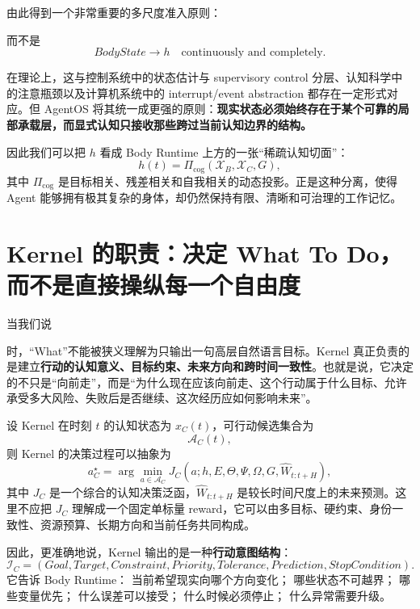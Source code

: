 由此得到一个非常重要的多尺度准入原则：
\begin{statementbox}
\centering
{}
\end{statementbox}
而不是
\[
BodyState
\rightarrow h
\quad
\text{continuously and completely}.
\]

在理论上，这与控制系统中的状态估计与 supervisory control 分层、认知科学中的注意瓶颈以及计算机系统中的 interrupt/event abstraction 都存在一定形式对应。但 AgentOS 将其统一成更强的原则：\textbf{现实状态必须始终存在于某个可靠的局部承载层，而显式认知只接收那些跨过当前认知边界的结构。}

因此我们可以把 $h$ 看成 Body Runtime 上方的一张“稀疏认知切面”：
\[
\boxed{
h(t)
=
\Pi_{\mathrm{cog}}
\left(
\mathcal X_B,
\mathcal X_C,
G
\right),
}
\]
其中 $\Pi_{\mathrm{cog}}$ 是目标相关、残差相关和自我相关的动态投影。正是这种分离，使得 Agent 能够拥有极其复杂的身体，却仍然保持有限、清晰和可治理的工作记忆。

\section{Kernel 的职责：决定 What To Do，而不是直接操纵每一个自由度}

当我们说
\begin{statementbox}
\centering
{}
\end{statementbox}
时，“What”不能被狭义理解为只输出一句高层自然语言目标。Kernel 真正负责的是建立\textbf{行动的认知意义、目标约束、未来方向和跨时间一致性}。也就是说，它决定的不只是“向前走”，而是“为什么现在应该向前走、这个行动属于什么目标、允许承受多大风险、失败后是否继续、这次经历应如何影响未来”。

设 Kernel 在时刻 $t$ 的认知状态为 $x_C(t)$，可行动候选集合为
\[
\mathcal A_C(t),
\]
则 Kernel 的决策过程可以抽象为
\[
a_C^\star
=
\arg\min_{a\in\mathcal A_C}
J_C
\left(
a;
h,E,\Theta,\Psi,\Omega,G,
\hat W_{t:t+H}
\right),
\]
其中 $J_C$ 是一个综合的认知决策泛函，$\hat W_{t:t+H}$ 是较长时间尺度上的未来预测。这里不应把 $J_C$ 理解成一个固定单标量 reward，它可以由多目标、硬约束、身份一致性、资源预算、长期方向和当前任务共同构成。

因此，更准确地说，Kernel 输出的是一种\textbf{行动意图结构}：
\[
\mathcal I_C
=
(
Goal,
Target,
Constraint,
Priority,
Tolerance,
Prediction,
StopCondition
).
\]
它告诉 Body Runtime：
当前希望现实向哪个方向变化；
哪些状态不可越界；
哪些变量优先；
什么误差可以接受；
什么时候必须停止；
什么异常需要升级。

